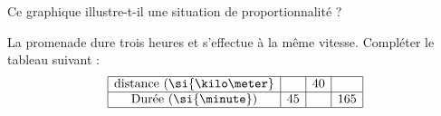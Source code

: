 
\begin{exercice}\label{exosmath-0948}

Ce graphique illustre-t-il une situation de proportionnalité ?

\begin{center}
   
\end{center}

La promenade dure trois heures et s'effectue à la même vitesse. Compléter le tableau suivant :
\begin{equation*}
    \begin{array}[]{|c|c|c|c|}
        \hline
        \text{distance (\si{\kilo\meter}}&&40&\\
          \hline
          \text{Durée (\si{\minute})}&45&&165\\
          \hline
    \end{array}
\end{equation*}


\end{exercice}
